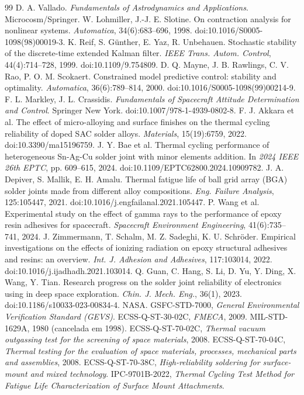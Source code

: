 \documentclass[12pt,a4paper]{article}
\begin{document}
\begin{thebibliography}{99}
 D. A. Vallado. \emph{Fundamentals of Astrodynamics and Applications}. Microcosm/Springer.
 W. Lohmiller, J.-J. E. Slotine. On contraction analysis for nonlinear systems. \emph{Automatica}, 34(6):683--696, 1998. doi:10.1016/S0005-1098(98)00019-3.
 K. Reif, S. G\"unther, E. Yaz, R. Unbehauen. Stochastic stability of the discrete-time extended Kalman filter. \emph{IEEE Trans. Autom. Control}, 44(4):714--728, 1999. doi:10.1109/9.754809.
 D. Q. Mayne, J. B. Rawlings, C. V. Rao, P. O. M. Scokaert. Constrained model predictive control: stability and optimality. \emph{Automatica}, 36(6):789--814, 2000. doi:10.1016/S0005-1098(99)00214-9.
 F. L. Markley, J. L. Crassidis. \emph{Fundamentals of Spacecraft Attitude Determination and Control}. Springer New York. doi:10.1007/978-1-4939-0802-8.
 F. J. Akkara et al. The effect of micro-alloying and surface finishes on the thermal cycling reliability of doped SAC solder alloys. \emph{Materials}, 15(19):6759, 2022. doi:10.3390/ma15196759.
 J. Y. Bae et al. Thermal cycling performance of heterogeneous Sn-Ag-Cu solder joint with minor elements addition. In \emph{2024 IEEE 26th EPTC}, pp. 609--615, 2024. doi:10.1109/EPTC62800.2024.10909782.
 J. A. Depiver, S. Mallik, E. H. Amalu. Thermal fatigue life of ball grid array (BGA) solder joints made from different alloy compositions. \emph{Eng. Failure Analysis}, 125:105447, 2021. doi:10.1016/j.engfailanal.2021.105447.
 P. Wang et al. Experimental study on the effect of gamma rays to the performance of epoxy resin adhesives for spacecraft. \emph{Spacecraft Environment Engineering}, 41(6):735--741, 2024.
 J. Zimmermann, T. Schalm, M. Z. Sadeghi, K. U. Schr\"oder. Empirical investigations on the effects of ionizing radiation on epoxy structural adhesives and resins: an overview. \emph{Int. J. Adhesion and Adhesives}, 117:103014, 2022. doi:10.1016/j.ijadhadh.2021.103014.
 Q. Guan, C. Hang, S. Li, D. Yu, Y. Ding, X. Wang, Y. Tian. Research progress on the solder joint reliability of electronics using in deep space exploration. \emph{Chin. J. Mech. Eng.}, 36(1), 2023. doi:10.1186/s10033-023-00834-4.
 NASA. GSFC-STD-7000, \emph{General Environmental Verification Standard (GEVS)}.
 ECSS-Q-ST-30-02C, \emph{FMECA}, 2009.
 MIL-STD-1629A, 1980 (cancelada em 1998).
 ECSS-Q-ST-70-02C, \emph{Thermal vacuum outgassing test for the screening of space materials}, 2008.
 ECSS-Q-ST-70-04C, \emph{Thermal testing for the evaluation of space materials, processes, mechanical parts and assemblies}, 2008.
 ECSS-Q-ST-70-38C, \emph{High-reliability soldering for surface-mount and mixed technology}.
 IPC-9701B-2022, \emph{Thermal Cycling Test Method for Fatigue Life Characterization of Surface Mount Attachments}.
\end{thebibliography}
\end{document}
